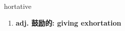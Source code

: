 
\begin{frame}
{\huge hortative}
\begin{center}
\begin{enumerate}\Large
  \item \textbf{adj. 鼓励的: giving exhortation}
\end{enumerate}
\end{center}
\end{frame}
